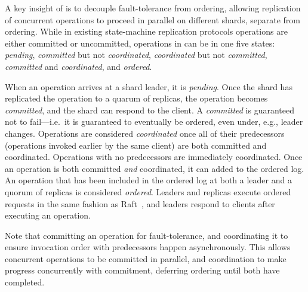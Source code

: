 
A key insight of \sys{} is to decouple fault-tolerance from ordering, allowing
replication of concurrent operations to proceed in parallel on different shards,
separate from ordering. While in existing state-machine replication protocols
operations are either committed or uncommitted, operations in \sys{} can be in
one five states: \textit{pending}, \textit{committed} but not
\textit{coordinated}, \textit{coordinated} but not \textit{committed},
\textit{committed} and \textit{coordinated}, and \textit{ordered}.

When an operation arrives at a shard leader, it is \textit{pending}. Once the
shard has replicated the operation to a quarum of replicas, the operation
becomes \textit{committed}, and the shard can respond to the client. A
\textit{committed} is guaranteed not to fail---i.e.\ it is guaranteed to
eventually be ordered, even under, e.g., leader changes. Operations are
considered \textit{coordinated} once all of their predecessors (operations
invoked earlier by the same client) are both committed and coordinated.
Operations with no predecessors are immediately coordinated. Once an operation
is both committed \emph{and} coordinated, it can added to the ordered log.  An
operation that has been included in the ordered log at both a leader and a
quorum of replicas is considered \textit{ordered}. Leaders and replicas execute
ordered requests in the same fashion as Raft~\cite{ongaro2014raft}, and leaders
respond to clients after executing an operation.



Note that committing an operation for fault-tolerance, and coordinating it to
ensure invocation order with predecessors happen asynchronously. This allows
concurrent operations to be committed in parallel, and coordination to make
progress concurrently with commitment, deferring ordering until both have
completed.


